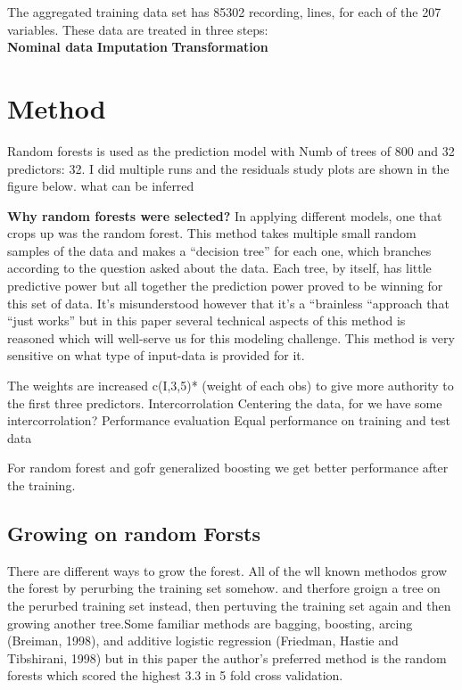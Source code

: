 \documentclass[journal]{/home/hoofar/LatexClasses/IEEEtran}
\begin{document}
 
The aggregated training data set has 85302 recording, lines, for each of the 207 variables. These data are treated in three steps:\\
\textbf{Nominal data }
\textbf{Imputation}
\textbf{Transformation}


\section{Method}


 
Random forests is used as the prediction model with Numb of trees of 800 and 32  predictors: 32. 
I did multiple runs and the residuals study plots are shown in the figure below. what can be inferred

\textbf{ Why random forests were selected?  }
In applying different models, one that crops up was the random forest. This method takes multiple small random samples of the data and makes a “decision tree” for each one, which branches according to the question asked about the data. Each tree, by itself, has little predictive power but all together the prediction power proved to be winning for this set of data. It’s misunderstood however that it’s a “brainless “approach that “just works” but in this paper several technical aspects of this method is reasoned which will well-serve us for this modeling challenge.  This method is very sensitive on what type of input-data is provided for it.


The weights are increased c(I,3,5)* (weight of each obs) to give more authority to the first three predictors. 
 Intercorrolation
Centering the data, for we have some intercorrolation? 
Performance evaluation
Equal performance on training and test data
 
For random forest and gofr generalized boosting we get better performance after the training.
\subsection*{Growing on random Forsts}
There are different ways to grow the forest. All of the wll known methodos grow the forest by perurbing the training set somehow. and therfore groign a tree on the perurbed training set instead, then pertuving the training set again and then growing another tree.Some familiar methods are bagging, boosting, arcing (Breiman, 1998), and additive logistic regression (Friedman, Hastie and Tibshirani, 1998) but in this paper the author's preferred method is the random forests which scored the highest 3.3 in 5 fold cross validation.
\end{document}
